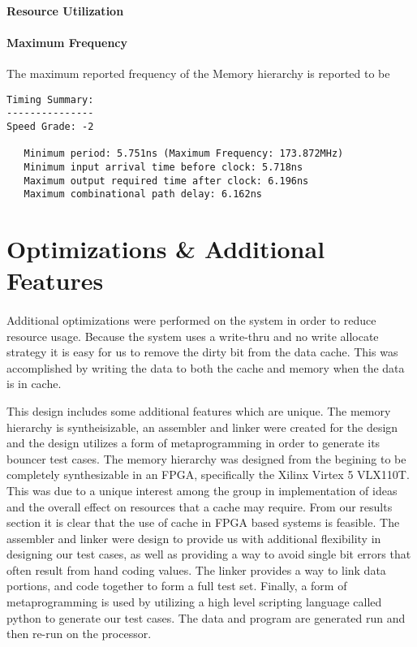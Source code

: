 \documentclass[11pt,letterpaper,final]{article}
\begin{document}
\paragraph{ Resource Utilization }


\paragraph{ Maximum Frequency }
The maximum reported frequency of the Memory hierarchy is reported to be 
\begin{verbatim}
Timing Summary:
---------------
Speed Grade: -2

   Minimum period: 5.751ns (Maximum Frequency: 173.872MHz)
   Minimum input arrival time before clock: 5.718ns
   Maximum output required time after clock: 6.196ns
   Maximum combinational path delay: 6.162ns
\end{verbatim}

\section{ Optimizations \& Additional Features }
\paragraph{}
Additional optimizations were performed on the system in order to reduce resource usage.  Because the system uses a write-thru and no write allocate strategy it is easy for us to remove the dirty bit from the data cache.  This was accomplished by writing the data to both the cache and memory when the data is in cache.

This design includes some additional features which are unique.  The memory hierarchy is syntheisizable, an assembler and linker were created for the design and the design utilizes a form of metaprogramming in order to generate its bouncer test cases.  The memory hierarchy was designed from the begining to be completely synthesizable in an FPGA, specifically the Xilinx Virtex 5 VLX110T.  This was due to a unique interest among the group in implementation of ideas and the overall effect on resources that a cache may require.  From our results section it is clear that the use of cache in FPGA based systems is feasible.  The assembler and linker were design to provide us with additional flexibility in designing our test cases, as well as providing a way to avoid single bit errors that often result from hand coding values.  The linker provides a way to link data portions, and code together to form a full test set. Finally, a form of metaprogramming is used by utilizing a high level scripting language called python to generate our test cases.  The data and program are generated run and then re-run on the processor.
\end{document}
